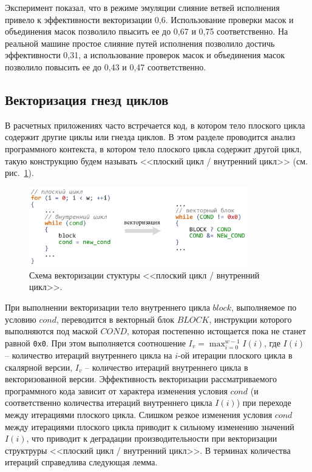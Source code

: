 Эксперимент показал, что в режиме эмуляции слияние ветвей исполнения привело к эффективности векторизации 0,6.
Использование проверки масок и объединения масок позволило пвысить ее до 0,67 и 0,75 соответственно.
На реальной машине простое слияние путей исполнения позволило достичь эффективности 0,31, а использование проверок масок и объединения масок позволило повысить ее до 0,43 и 0,47 соответственно.


\subsection{Векторизация гнезд циклов}

В расчетных приложениях часто встречается код, в котором тело плоского цикла содержит другие циклы или гнезда циклов.
В этом разделе проводится анализ программного контекста, в котором тело плоского цикла содержит другой цикл, такую конструкцию будем называть <<плоский цикл / внутренний цикл>> (см. рис.~\ref{fig:vec_flat_loop_nest}).

\begin{figure}[!ht]
\centering
\includegraphics[width=0.85\textwidth]{fig/vec_flat_loop_nest.pdf}
\singlespacing
\caption{Схема векторизации стуктуры <<плоский цикл / внутренний цикл>>.}
\label{fig:vec_flat_loop_nest}
\end{figure}

При выполнении векторизации тело внутреннего цикла $block$, выполняемое по условию $cond$, переводится в векторный блок $BLOCK$, инструкции которого выполняются под маской $COND$, которая постепенно истощается пока не станет равной \texttt{0x0}.
При этом выполняется соотношение $I_v = \max_{i = 0}^{w - 1}{I(i)}$, где $I(i)$ -- количество итераций внутреннего цикла на $i$-ой итерации плоского цикла в скалярной версии, $I_v$ -- количество итераций внутреннего цикла в векторизованной версии.
Эффективность векторизации рассматриваемого программного кода зависит от характера изменения условия $cond$ (и соответственно количества итераций внутреннего цикла $I(i)$) при переходе между итерациями плоского цикла.
Слишком резкое изменения условия $cond$ между итерациями плоского цикла приводит к сильному изменению значений $I(i)$, что приводит к деградации производительности при векторизации структруры <<плоский цикл / внутренний цикл>>.
В терминах количества итераций справедлива следующая лемма.

